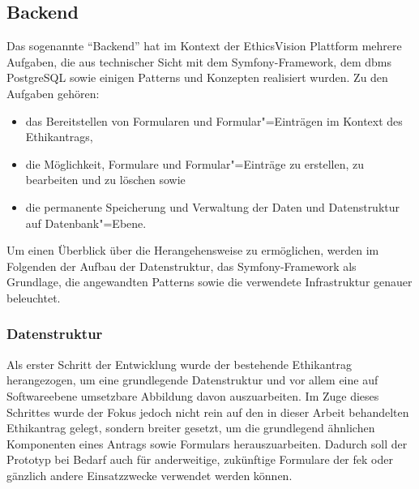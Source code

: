 \documentclass[a4paper,12pt,twoside,numbers=noendperiod]{scrreprt}
\begin{document}
\subsection{Backend}
\label{sub-sec:ausarbeitung-backend}

Das sogenannte \enquote{Backend} hat im Kontext der EthicsVision Plattform mehrere Aufgaben, die aus technischer Sicht mit dem Symfony-Framework, dem \ac{dbms} PostgreSQL sowie einigen Patterns und Konzepten realisiert wurden. Zu den Aufgaben gehören:
\begin{itemize}
    \item das Bereitstellen von Formularen und Formular"=Einträgen im Kontext des Ethikantrags,
    \item die Möglichkeit, Formulare und Formular"=Einträge zu erstellen, zu bearbeiten und zu löschen sowie
    \item die permanente Speicherung und Verwaltung der Daten und Datenstruktur auf Datenbank"=Ebene.
\end{itemize}

Um einen Überblick über die Herangehensweise zu ermöglichen, werden im Folgenden der Aufbau der Datenstruktur, das Symfony-Framework als Grundlage, die angewandten Patterns sowie die verwendete Infrastruktur genauer beleuchtet.

\subsubsection*{Datenstruktur}
\label{sub-sub-sec:backend-datenstruktur}

Als erster Schritt der Entwicklung wurde der bestehende Ethikantrag herangezogen, um eine grundlegende Datenstruktur und vor allem eine auf Softwareebene umsetzbare Abbildung davon auszuarbeiten. Im Zuge dieses Schrittes wurde der Fokus jedoch nicht rein auf den in dieser Arbeit behandelten Ethikantrag gelegt, sondern breiter gesetzt, um die grundlegend ähnlichen Komponenten eines Antrags sowie Formulars herauszuarbeiten. Dadurch soll der Prototyp bei Bedarf auch für anderweitige, zukünftige Formulare der \ac{fek} oder gänzlich andere Einsatzzwecke verwendet werden können.
\end{document}
